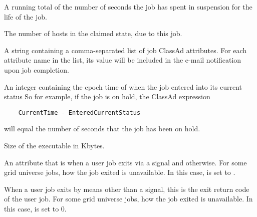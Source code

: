 \begin{description}
\item[\AdAttr{CumulativeSuspensionTime}:]  A running total of the number of
seconds the job has spent in suspension for the life of the job.

\item[\AdAttr{CurrentHosts}:]  The number of hosts in the claimed state,
due to this job.

\item[\AdAttr{EmailAttributes}:]  A string containing a comma-separated
list of job ClassAd attributes. For each attribute name in the list,
its value will be included in the e-mail notification upon job completion.

\item[\AdAttr{EnteredCurrentStatus}:]  An integer containing the
epoch time of when the job entered into its current status
So for example, if the job is on hold, the ClassAd expression
\begin{verbatim}
    CurrentTime - EnteredCurrentStatus
\end{verbatim}
will equal the number of seconds that the job has been on hold.

\item[\AdAttr{ExecutableSize}:]  Size of the executable in Kbytes.

\item[\AdAttr{ExitBySignal}:]  An attribute that is 
when a user job exits via a signal and  otherwise.
For some grid universe jobs, how the job exited is
unavailable. In this case,  is set to  .

\item[\AdAttr{ExitCode}:]  When a user job exits by means other than a signal,
this is the exit return code of the user job.
For some grid universe jobs, how the job exited is
unavailable. In this case,  is set to  0.


\end{description}
